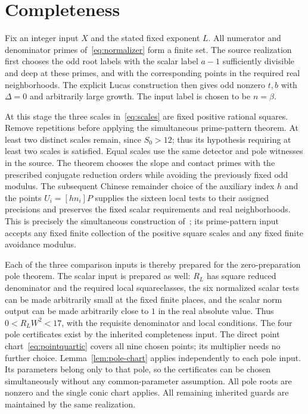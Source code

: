 \documentclass[11pt,a4paper]{article}
\begin{document}
\section{Completeness}

Fix an integer input $X$ and the stated fixed exponent $L$. All numerator
and denominator primes of~\eqref{eq:normalizer} form a finite
set. The source realization first chooses the odd root labels
with the scalar label $a-1$ sufficiently divisible and deep at
these primes, and with the corresponding points in the required
real neighborhoods. The explicit Lucas construction then gives
odd nonzero $t,b$ with $\Delta=0$ and arbitrarily large
growth. The input label is chosen to be $n=\beta$.

At this stage the three scales in~\eqref{eq:scales} are fixed
positive rational squares. Remove repetitions before applying the
simultaneous prime-pattern theorem. At least two distinct scales
remain, since $S_0>12$; thus its hypothesis requiring at least two
scales is satisfied. Equal scales use the same detector and pole
witnesses in the source. The theorem chooses the slope
and contact primes with the prescribed conjugate reduction
orders while avoiding the previously fixed odd modulus. The
subsequent Chinese remainder choice of the auxiliary index $h$
and the points $U_i=[hn_i]P$ supplies the sixteen local tests
to their assigned precisions and preserves the fixed scalar
requirements and real neighborhoods. This is precisely the
simultaneous construction of~\cite{Dependencies,Baseline}; its
prime-pattern input accepts any fixed finite collection of the
positive square scales and any fixed finite avoidance modulus.

Each of the three comparison inputs is thereby prepared for the
zero-preparation pole theorem. The scalar input is prepared as
well: $R_L$ has square reduced denominator and the required
local squareclasses, the six normalized scalar tests can be made
arbitrarily small at the fixed finite places, and the scalar
norm output can be made arbitrarily close to $1$ in the real
absolute value. Thus $0<R_LW^2<17$, with the requisite
denominator and local conditions. The four pole certificates
exist by the inherited completeness input. The direct point chart~\eqref{eq:pointquartic} covers all nine
chosen points; its multiplier needs no further choice.
Lemma~\ref{lem:pole-chart} applies independently to each pole input.
Its parameters belong only to that pole, so the certificates can
be chosen simultaneously without any common-parameter assumption.
All pole roots are nonzero and the single conic chart applies.
All remaining inherited guards are maintained by the same realization.
\end{document}
